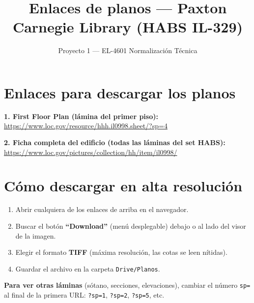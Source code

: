 \documentclass[12pt]{article}
\title{Enlaces de planos --- Paxton Carnegie Library (HABS IL-329)}
\author{Proyecto 1 --- EL-4601 Normalizaci\'on T\'ecnica}
\date{}
\begin{document}
\maketitle

\section*{Enlaces para descargar los planos}

\textbf{1. First Floor Plan (l\'amina del primer piso):}\\
\url{https://www.loc.gov/resource/hhh.il0998.sheet/?sp=4}

\vspace{1em}

\textbf{2. Ficha completa del edificio (todas las l\'aminas del set HABS):}\\
\url{https://www.loc.gov/pictures/collection/hh/item/il0998/}

\vspace{2em}

\section*{C\'omo descargar en alta resoluci\'on}
\begin{enumerate}
    \item Abrir cualquiera de los enlaces de arriba en el navegador.
    \item Buscar el bot\'on \textbf{``Download''} (men\'u desplegable) debajo o al lado del visor de la imagen.
    \item Elegir el formato \textbf{TIFF} (m\'axima resoluci\'on, las cotas se leen n\'itidas).
    \item Guardar el archivo en la carpeta \texttt{Drive/Planos}.
\end{enumerate}

\textbf{Para ver otras l\'aminas} (s\'otano, secciones, elevaciones), cambiar el n\'umero
\texttt{sp=} al final de la primera URL: \texttt{?sp=1}, \texttt{?sp=2}, \texttt{?sp=5}, etc.
\end{document}
